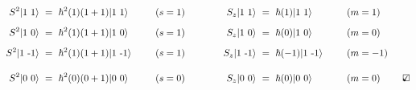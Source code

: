 \documentclass[12pt]{article}
\newcommand{\checkedbox}{\mbox{\ooalign{$\checkmark$\cr\hidewidth$\square$\hidewidth\cr}}} %
\begin{document}
\vspace{20pt} \noindent
\( \begin{aligned}[b]
    S^2 | 1 \ 1 \rangle \ &= \ 
        \hbar^2(1)(1+1) | 1 \ 1 \rangle& \indent (s&=1) 
    & \indent\indent 
    S_z | 1 \ 1 \rangle \ &= \ 
        \hbar(1) | 1 \ 1 \rangle& \indent (m&=1)
    \\[5pt]
    S^2 | 1 \ 0 \rangle \ &= \ 
        \hbar^2(1)(1+1) | 1 \ 0 \rangle& \indent (s&=1)
    & \indent\indent
    S_z | 1 \ 0 \rangle \ &= \ 
        \hbar(0) | 1 \ 0 \rangle& \indent (m&=0)
    \\[5pt]
    S^2 | 1 \ \text{-} 1 \rangle \ &= \ 
        \hbar^2(1)(1+1) | 1 \ \text{-} 1 \rangle& \indent (s&=1)
    & \indent\indent
    S_z | 1 \ \text{-} 1 \rangle \ &= \ 
        \hbar(-1) | 1 \ \text{-} 1 \rangle& \indent (m&=-1)
    \\[10pt]
    S^2 | 0 \ 0 \rangle \ &= \ 
        \hbar^2(0)(0+1) | 0 \ 0 \rangle& \indent (s&=0) 
    & \indent\indent
    S_z | 0 \ 0 \rangle \ &= \ 
        \hbar(0) | 0 \ 0 \rangle& \indent (m&=0)
\end{aligned} \indent \checkedbox \)
\end{document}

